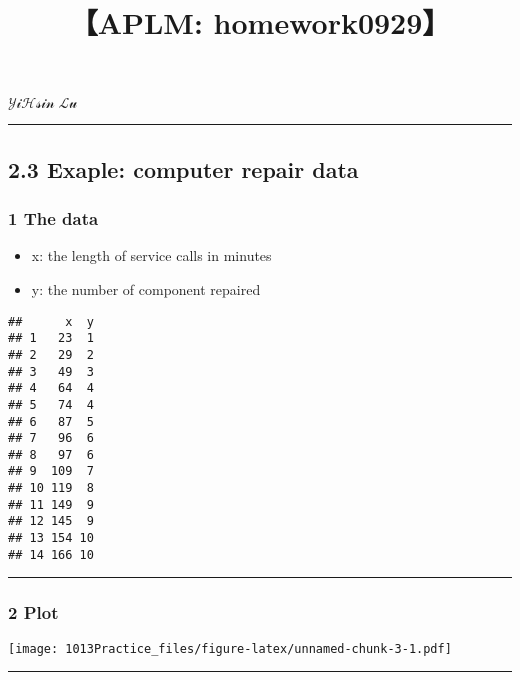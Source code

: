 \documentclass[
]{article}
\title{\textbf{【APLM: homework0929】}}
\author{}
\date{\vspace{-2.5em}}
\providecommand{\tightlist}{%
  \setlength{\itemsep}{0pt}\setlength{\parskip}{0pt}}
\begin{document}
\maketitle

\textbf{\(\mathcal{YiHsin}\;\mathcal{Lu}\)}

\begin{center}\rule{0.5\linewidth}{0.5pt}\end{center}

\hypertarget{exaple-computer-repair-data}{%
\subsection{\texorpdfstring{\textbf{2.3 Exaple: computer repair
data}}{2.3 Exaple: computer repair data}}\label{exaple-computer-repair-data}}

\hypertarget{the-data}{%
\subsubsection{\texorpdfstring{\textbf{1 The
data}}{1 The data}}\label{the-data}}

\begin{itemize}
\tightlist
\item
  x: the length of service calls in minutes
\item
  y: the number of component repaired
\end{itemize}

\begin{verbatim}
##      x  y
## 1   23  1
## 2   29  2
## 3   49  3
## 4   64  4
## 5   74  4
## 6   87  5
## 7   96  6
## 8   97  6
## 9  109  7
## 10 119  8
## 11 149  9
## 12 145  9
## 13 154 10
## 14 166 10
\end{verbatim}

\begin{center}\rule{0.5\linewidth}{0.5pt}\end{center}

\hypertarget{plot}{%
\subsubsection{\texorpdfstring{\textbf{2 Plot}}{2 Plot}}\label{plot}}

\texttt{[image: 1013Practice\_files/figure-latex/unnamed-chunk-3-1.pdf]}

\begin{center}\rule{0.5\linewidth}{0.5pt}\end{center}
\end{document}
